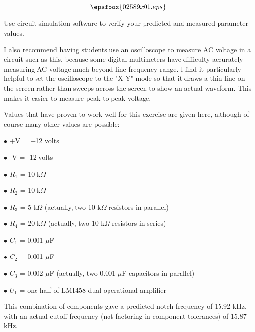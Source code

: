 

$$\epsfbox{02589x01.eps}$$

\vfil \eject






Use circuit simulation software to verify your predicted and measured parameter values.







I also recommend having students use an oscilloscope to measure AC voltage in a circuit such as this, because some digital multimeters have difficulty accurately measuring AC voltage much beyond line frequency range.  I find it particularly helpful to set the oscilloscope to the "X-Y" mode so that it draws a thin line on the screen rather than sweeps across the screen to show an actual waveform.  This makes it easier to measure peak-to-peak voltage.

Values that have proven to work well for this exercise are given here, although of course many other values are possible:

\medskip
\goodbreak
\item{$\bullet$} +V = +12 volts
\item{$\bullet$} -V = -12 volts
\item{$\bullet$} $R_1$ = 10 k$\Omega$
\item{$\bullet$} $R_2$ = 10 k$\Omega$
\item{$\bullet$} $R_3$ = 5 k$\Omega$ (actually, two 10 k$\Omega$ resistors in parallel)
\item{$\bullet$} $R_4$ = 20 k$\Omega$ (actually, two 10 k$\Omega$ resistors in series)
\item{$\bullet$} $C_1$ = 0.001 $\mu$F
\item{$\bullet$} $C_2$ = 0.001 $\mu$F
\item{$\bullet$} $C_3$ = 0.002 $\mu$F (actually, two 0.001 $\mu$F capacitors in parallel)
\item{$\bullet$} $U_1$ = one-half of LM1458 dual operational amplifier
\medskip

This combination of components gave a predicted notch frequency of 15.92 kHz, with an actual cutoff frequency (not factoring in component tolerances) of 15.87 kHz.




